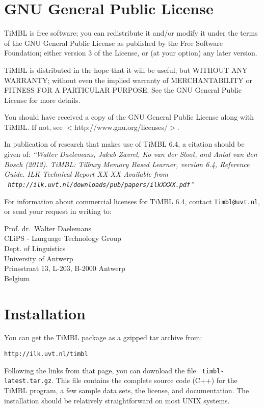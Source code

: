 \documentclass{book}
\begin{document}
\chapter{GNU General Public License}
\label{license}

TiMBL is free software; you can redistribute it and/or modify it under
the terms of the GNU General Public License as published by the Free
Software Foundation; either version 3 of the License, or (at your
option) any later version.

TiMBL is distributed in the hope that it will be useful, but WITHOUT
ANY WARRANTY; without even the implied warranty of MERCHANTABILITY or
FITNESS FOR A PARTICULAR PURPOSE.  See the GNU General Public License
for more details.

You should have received a copy of the GNU General Public License
along with TiMBL.  If not, see $<$http://www.gnu.org/licenses/$>$.

In publication of research that makes use of TiMBL 6.4, a citation
should be given of: {\em ``Walter Daelemans, Jakub Zavrel, Ko van der
  Sloot, and Antal van den Bosch (2012). TiMBL: Tilburg Memory Based
  Learner, version 6.4, Reference Guide. ILK Technical Report XX-XX
  Available from \\ {\tt
    http://ilk.uvt.nl/downloads/pub/papers/ilkXXXX.pdf}''}

For information about commercial licenses for TiMBL 6.4,
contact {\tt Timbl@uvt.nl}, or send your request in writing to:

Prof. dr.~Walter Daelemans\\
CLiPS - Language Technology Group\\
Dept. of Linguistics \\
University of Antwerp\\
Prinsstraat 13, L-203, B-2000 Antwerp \\
Belgium

\pagestyle{headings}

\chapter{Installation}
\vspace{-1cm}
You can get the TiMBL package as a gzipped tar archive from:

{\tt http://ilk.uvt.nl/timbl}

Following the links from that page, you can download the file {\tt
  timbl-latest.tar.gz}. This file contains the complete source code (C++)
for the TiMBL program, a few sample data sets, the license, and
documentation. The installation should be relatively straightforward
on most UNIX systems.
\end{document}
